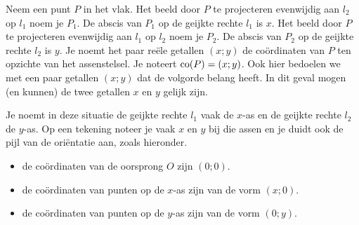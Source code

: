 Neem een punt $P$ in het vlak.
Het beeld door $P$ te projecteren evenwijdig aan $l_2$ op $l_1$ noem je $P_1$.
De abscis van $P_1$  op de geijkte rechte $l_1$ is $x$.
Het beeld door $P$ te projecteren evenwijdig aan $l_1$ op $l_2$ noem je $P_2$.
De abscis van $P_2$ op de geijkte rechte $l_2$ is $y$.
Je noemt het paar re\"ele getallen $(x;y)$ de co\"ordinaten van $P$ ten opzichte van het assenstelsel.
Je noteert $\operatorname{co} (P)=(x;y)$.
Ook hier bedoelen we met een paar getallen $(x;y)$ dat de volgorde belang heeft.
In dit geval mogen (en kunnen) de twee getallen $x$ en $y$ gelijk zijn.

Je noemt in deze situatie de geijkte rechte $l_1$ vaak de $x$-as en de geijkte rechte $l_2$ de $y$-as.
Op een tekening noteer je vaak $x$ en $y$ bij die assen en je duidt ook de pijl van de ori\"entatie aan, zoals hieronder.

\begin{center}
\end{center}




\begin{opmerking}
	\begin{itemize}
\item de co\"ordinaten van de oorsprong $O$ zijn $(0;0)$.
\item de co\"ordinaten van punten op de $x$-as zijn van de vorm $(x;0)$.
\item de co\"ordinaten van punten op de $y$-as zijn van de vorm $(0;y)$.
\end{itemize}
\end{opmerking}

